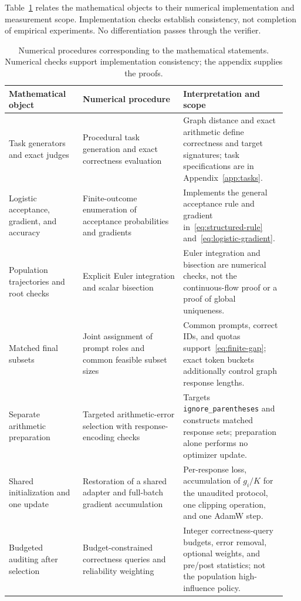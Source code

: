 Table~\ref{tab:code-correspondence} relates the mathematical objects to
their numerical implementation and measurement scope. Implementation
checks establish consistency, not completion of empirical experiments.
No differentiation passes through the verifier.

\begin{table}[H]
\caption{Numerical procedures corresponding to the mathematical statements. Numerical
checks support implementation consistency; the appendix supplies the proofs.}
\label{tab:code-correspondence}
\centering\small
\begin{tabular}{@{}p{0.25\linewidth}p{0.34\linewidth}p{0.35\linewidth}@{}}
\toprule
Mathematical object & Numerical procedure & Interpretation and scope\\
\midrule
Task generators and exact judges
& Procedural task generation and exact correctness evaluation
& Graph distance and exact arithmetic define correctness and target signatures; task specifications are in Appendix~\ref{app:tasks}.\\[3pt]
Logistic acceptance, gradient, and accuracy
& Finite-outcome enumeration of acceptance probabilities and gradients
& Implements the general acceptance rule and gradient in~\eqref{eq:structured-rule} and~\eqref{eq:logistic-gradient}.\\[3pt]
Population trajectories and root checks
& Explicit Euler integration and scalar bisection
& Euler integration and bisection are numerical checks, not the continuous-flow proof or a proof of global uniqueness.\\[3pt]
Matched final subsets
& Joint assignment of prompt roles and common feasible subset sizes
& Common prompts, correct IDs, and quotas support~\eqref{eq:finite-gap}; exact token buckets additionally control graph response lengths.\\[3pt]
Separate arithmetic preparation
& Targeted arithmetic-error selection with response-encoding checks
& Targets \texttt{ignore\_parentheses} and constructs matched response sets; preparation alone performs no optimizer update.\\[3pt]
Shared initialization and one update
& Restoration of a shared adapter and full-batch gradient accumulation
& Per-response loss, accumulation of $g_i/K$ for the unaudited protocol, one clipping operation, and one AdamW step.\\[3pt]
Budgeted auditing after selection
& Budget-constrained correctness queries and reliability weighting
& Integer correctness-query budgets, error removal, optional weights, and pre/post statistics; not the population high-influence policy.\\[3pt]

\end{tabular}
\end{table}
